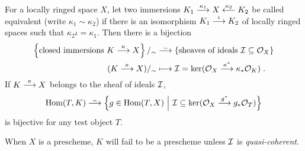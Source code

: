 \documentclass[a4paper,parskip=half,numbers=enddot, DIV=12]{scrreprt}
\begin{document}
\begin{prop}
    For a locally ringed space $X$, let two immersions $K_1\morphism[\kappa_1] X\lmorphism[\kappa_2] K_2$ be called equivalent (write $\kappa_1\sim\kappa_2$) if there is an isomorphism $K_1\morphism[\iota] K_2$ of locally ringed spaces such that $\kappa_2\iota = \kappa_1$. Then there is a bijection 
    \begin{align*}
	    \left\{\text{closed immersions }K\morphism[\kappa]X\right\}/_\sim&\isomorphism\left\{\text{sheaves of ideals }\Ii\subseteq \Oo_X\right\}\\
        (K\morphism[\kappa]X)/_\sim &\longmapsto \Ii = \ker(\Oo_X\morphism[\kappa^*]\kappa_* \Oo_K)\;.
    \end{align*}
    If $K\morphism[\kappa] X$ belongs to the sheaf of ideals $\mathcal{I}$,
    \begin{align*}
        \Hom(T,K) \isomorphism\left\{ g\in \Hom(T,X) \st \Ii\subseteq \ker(\Oo_X \morphism[g^*]g_*\Oo_T)\right\}
    \end{align*}
    is bijective for any test object $T$.
\end{prop}
\begin{rem*}
    When $X$ is a prescheme, $K$ will fail to be a prescheme unless $\mathcal{I}$ is \emph{quasi-coherent}.
\end{rem*}
\end{document}
